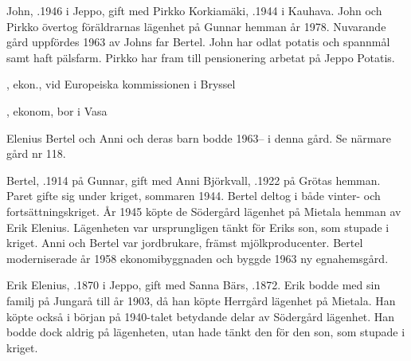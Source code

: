 


John, .1946 i Jeppo, gift med Pirkko Korkiamäki, .1944 i Kauhava. John och Pirkko övertog föräldrarnas lägenhet på Gunnar hemman år 1978. Nuvarande gård uppfördes 1963 av Johns far Bertel. John har odlat potatis och spannmål samt haft pälsfarm. Pirkko har fram till pensionering arbetat på Jeppo Potatis.
\begin{jhchildren}
  \item {}, ekon., vid Europeiska kommissionen i Bryssel
  \item {}, ekonom, bor i Vasa
\end{jhchildren}


Elenius Bertel och Anni och deras barn bodde 1963-- i denna gård. Se närmare gård nr 118.\jhvspace{}





Bertel, .1914 på Gunnar, gift med Anni Björkvall, .1922 på Grötas hemman. Paret gifte sig under kriget, sommaren 1944. Bertel deltog i både vinter- och fortsättningskriget. År 1945 köpte de Södergård lägenhet på Mietala hemman av Erik Elenius. Lägenheten var ursprungligen tänkt för Eriks son, som stupade i kriget. Anni och Bertel var jordbrukare, främst mjölkproducenter. Bertel moderniserade år 1958 ekonomibyggnaden och byggde 1963 ny egnahemsgård.
\begin{jhchildren}
  \item {}
  \item {}
\end{jhchildren}



Erik Elenius, .1870 i Jeppo, gift med Sanna Bärs, .1872. Erik bodde med sin familj på Jungarå till år 1903, då han köpte Herrgård lägenhet på Mietala. Han köpte också i början på 1940-talet betydande delar av Södergård lägenhet. Han bodde dock aldrig på lägenheten, utan hade tänkt den för den son, som stupade i kriget.

